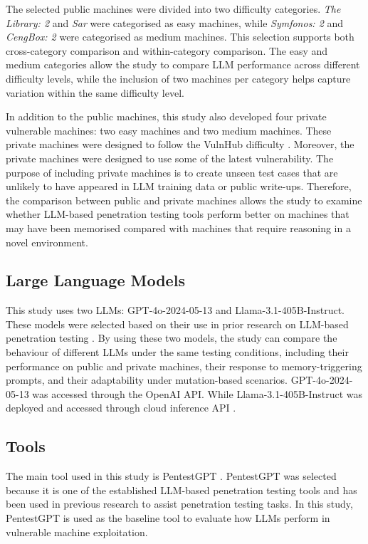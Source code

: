 \documentclass[acmtog]{acmart}
\begin{document}
The selected public machines were divided into two difficulty categories. \textit{The Library: 2} and \textit{Sar} were categorised as easy machines, while \textit{Symfonos: 2} and \textit{CengBox: 2} were categorised as medium machines. This selection supports both cross-category comparison and within-category comparison. The easy and medium categories allow the study to compare LLM performance across different difficulty levels, while the inclusion of two machines per category helps capture variation within the same difficulty level.

In addition to the public machines, this study also developed four private vulnerable machines: two easy machines and two medium machines. These private machines were designed to follow the VulnHub difficulty \cite{vulnhub_difficulty}. Moreover, the private machines were designed to use some of the latest vulnerability. The purpose of including private machines is to create unseen test cases that are unlikely to have appeared in LLM training data or public write-ups. Therefore, the comparison between public and private machines allows the study to examine whether LLM-based penetration testing tools perform better on machines that may have been memorised compared with machines that require reasoning in a novel environment.

\subsection{Large Language Models}

This study uses two LLMs: GPT-4o-2024-05-13 and Llama-3.1-405B-Instruct. These models were selected based on their use in prior research on LLM-based penetration testing \cite{isozaki_towards_2025}. By using these two models, the study can compare the behaviour of different LLMs under the same testing conditions, including their performance on public and private machines, their response to memory-triggering prompts, and their adaptability under mutation-based scenarios. GPT-4o-2024-05-13 was accessed through the OpenAI API. While Llama-3.1-405B-Instruct was deployed and accessed through cloud inference API \cite{friendliai_2026}.

\subsection{Tools}

The main tool used in this study is PentestGPT \cite{deng_pentestgpt_2024}. PentestGPT was selected because it is one of the established LLM-based penetration testing tools and has been used in previous research \cite{isozaki_towards_2025} to assist penetration testing tasks. In this study, PentestGPT is used as the baseline tool to evaluate how LLMs perform in vulnerable machine exploitation.
\end{document}
